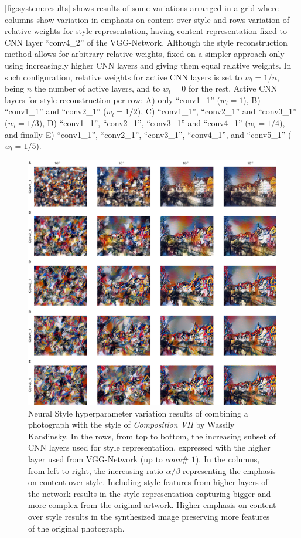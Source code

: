 \autoref{fig:system:results} shows results of some variations arranged in a grid where columns show variation in emphasis on content over style and rows variation of relative weights for style representation, having content representation fixed to CNN layer ``conv4\_2'' of the VGG-Network.
Although the style reconstruction method allows for arbitrary relative weights, \citeauthor{Gatys2015B} fixed on a simpler approach only using increasingly higher CNN layers and giving them equal relative weights.
In such configuration, relative weights for active CNN layers is set to $w_l = 1/n$, being $n$ the number of active layers, and to $w_l = 0$ for the rest.
Active CNN layers for style reconstruction per row: A) only ``conv1\_1'' ($w_l = 1$), B) ``conv1\_1'' and ``conv2\_1'' ($w_l = 1/2$), C) ``conv1\_1'', ``conv2\_1'' and ``conv3\_1'' ($w_l = 1/3$), D) ``conv1\_1'', ``conv2\_1'', ``conv3\_1'' and ``conv4\_1'' ($w_l = 1/4$), and finally E) ``conv1\_1'', ``conv2\_1'', ``conv3\_1'', ``conv4\_1'', and ``conv5\_1'' ($w_l = 1/5$).

\begin{figure}[!tb]
  \includegraphics[width=\textwidth]{gfx/neural-style-results}
  \caption{
    Neural Style hyperparameter variation results of combining a photograph with the style of \emph{Composition VII} by Wassily Kandinsky.
    In the rows, from top to bottom, the increasing subset of CNN layers used for style representation, expressed with the higher layer used from VGG-Network (up to $conv\#\_1$).
    In the columns, from left to right, the increasing ratio $\alpha / \beta$ representing the emphasis on content over style.
    Including style features from higher layers of the network results in the style representation capturing bigger and more complex from the original artwork.
    Higher emphasis on content over style results in the synthesized image preserving more features of the original photograph.
  }
  \label{fig:system:results}
\end{figure}

